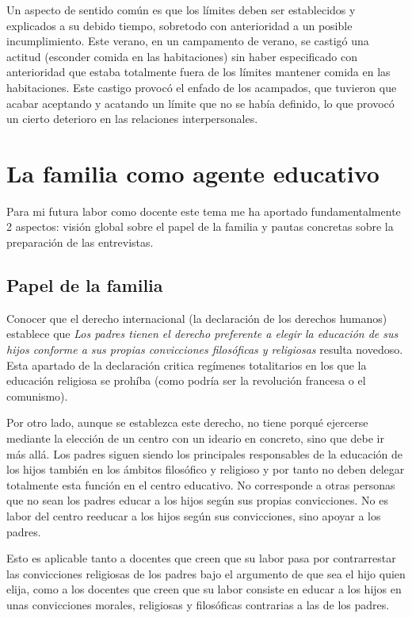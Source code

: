 Un aspecto de sentido común es que los límites deben ser establecidos y explicados a su debido tiempo, sobretodo con anterioridad a un posible incumplimiento.
%
Este verano, en un campamento de verano, se castigó una actitud (esconder comida en las habitaciones) sin haber especificado con anterioridad que estaba totalmente fuera de los límites mantener comida en las habitaciones.
%
Este castigo provocó el enfado de los acampados, que tuvieron que acabar aceptando y acatando un límite que no se había definido, lo que provocó un cierto deterioro en las relaciones interpersonales.


\newpage
\section{La familia como agente educativo}

Para mi futura labor como docente este tema me ha aportado fundamentalmente 2 aspectos: visión global sobre el papel de la familia y pautas concretas sobre la preparación de las entrevistas.

\subsection{Papel de la familia}

Conocer que el derecho internacional (la declaración de los derechos humanos) establece que \textit{Los padres tienen el derecho preferente a elegir la educación de sus hijos conforme a sus propias convicciones filosóficas y religiosas} resulta novedoso.
%
Esta apartado de la declaración critica regímenes totalitarios en los que la educación religiosa se prohíba (como podría ser la revolución francesa o el comunismo).

Por otro lado, aunque se establezca este derecho, no tiene porqué ejercerse mediante la elección de un centro con un ideario en concreto, sino que debe ir más allá.
%
Los padres siguen siendo los principales responsables de la educación de los hijos también en los ámbitos filosófico y religioso y por tanto no deben delegar totalmente esta función en el centro educativo.
%
No corresponde a otras personas que no sean los padres educar a los hijos según sus propias convicciones.
%
No es labor del centro reeducar a los hijos según sus convicciones, sino apoyar a los padres.

Esto es aplicable tanto a docentes que creen que su labor pasa por contrarrestar las convicciones religiosas de los padres bajo el argumento de que sea el hijo quien elija, como a los docentes que creen que su labor consiste en educar a los hijos en unas convicciones morales, religiosas y filosóficas contrarias a las de los padres.

